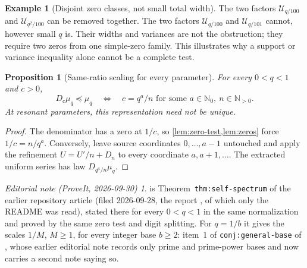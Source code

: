 \documentclass[11pt,letterpaper]{article}
\newtheorem{proposition}[theorem]{Proposition}
\theoremstyle{definition}
\newtheorem{example}[theorem]{Example}
\theoremstyle{remark}
\newtheorem*{ednote}{Editorial note (ProveIt, 2026-09-30)}
\newcommand{\N}{\mathbb N_0}
\newcommand{\Np}{\mathbb N_{>0}}
\newcommand{\Un}{\mathcal U}
\numberwithin{equation}{section}
\begin{document}
\begin{example}[Disjoint zero classes, not small total width]
The two factors $\Un_{q/100}$ and $\Un_{q^2/100}$ can be removed together. The two factors $\Un_{q/100}$ and $\Un_{q/101}$ cannot, however small $q$ is. Their widths and variances are not the obstruction; they require two zeros from one simple-zero family. This illustrates why a support or variance inequality alone cannot be a complete test.
\end{example}

\begin{proposition}[Same-ratio scaling for every parameter]\label{prop:same}
For every $0<q<1$ and $c>0$,
\begin{equation}\label{eq:same}
 D_c\mu_q\preceq\mu_q
 \quad\Longleftrightarrow\quad
 c=q^a/n\text{ for some }a\in\N,\ n\in\Np.
\end{equation}
At resonant parameters, this representation need not be unique.
\end{proposition}
\begin{proof}
The denominator has a zero at $1/c$, so \cref{lem:zero-test,lem:zeros} force $1/c=n/q^a$. Conversely, leave source coordinates $0,\ldots,a-1$ untouched and apply the refinement $U=U'/n+D_n$ to every coordinate $a,a+1,\ldots$. The extracted uniform series has law $D_{q^a/n}\mu_q$.
\end{proof}
\begin{ednote}
 is Theorem~\texttt{thm:self-spectrum} of the earlier
repository article
 (filed
2026-09-28, the report \cite{repo-ladders}, of which only the README was
read), stated there for every $0<q<1$ in the same normalization and proved
by the same zero test and digit splitting. For $q=1/b$ it gives the scales
$1/M$, $M\ge1$, for every integer base $b\ge2$: item~1 of
\texttt{conj:general-base} of
, whose
earlier editorial note records only prime and prime-power bases and now
carries a second note saying so.
\end{ednote}
\end{document}
